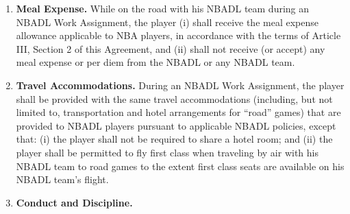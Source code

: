 \documentclass[
]{book}
\begin{document}
\begin{enumerate}
\begin{enumerate}
  \end{enumerate}
\item
  \textbf{Meal Expense.} While on the road with his NBADL team during an NBADL Work Assignment, the player (i) shall receive the meal expense allowance applicable to NBA players, in accordance with the terms of Article III, Section 2 of this Agreement, and (ii) shall not receive (or accept) any meal expense or per diem from the NBADL or any NBADL team.
\item
  \textbf{Travel Accommodations.} During an NBADL Work Assignment, the player shall be provided with the same travel accommodations (including, but not limited to, transportation and hotel arrangements for ``road'' games) that are provided to NBADL players pursuant to applicable NBADL policies, except that: (i) the player shall not be required to share a hotel room; and (ii) the player shall be permitted to fly first class when traveling by air with his NBADL team to road games to the extent first class seats are available on his NBADL team's flight.
\item
  \textbf{Conduct and Discipline.}


\end{enumerate}
\end{document}
